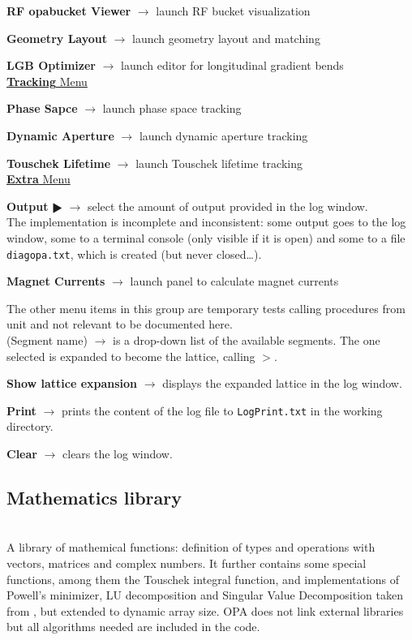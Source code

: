 \documentclass[12pt]{article}
\newcommand\code[1]{{\tt #1}}
\newcommand{\ofld}[1]{\colorbox{black!15}{{{\color{black}\bf #1}}}}
\newcommand{\ofldx}[1]{\colorbox{black!15}{{\color{black}(#1)}}}
\newcommand\guico[1]{{\color{blue}\code{#1}}}
\newcommand{\unico}[1]{{\color{burntorange}\code{#1}}}
\newcommand{\evcod}[2]{\ofld{#1} $\rightarrow$ \guico{#2}}
\newcommand{\evcodx}[2]{\ofldx{#1} $\rightarrow$ \guico{#2}}
\newcommand{\prcod}[2]{\opauni{#1}$>$\unico{#2}}
\newcommand{\opagui}[1]{\colorbox{blue!20}{{\color{black}\code{#1}}}}
\newcommand{\ogui}[1]{\hyperref[#1]{\opagui{#1}}}
\newcommand{\opauni}[1]{\colorbox{orange!30}{{\color{black}\code{#1}}}}
\newcommand{\ounih}[2]{\subsection{\label{#2}#1}{\Huge\opauni{#2}}\\}
\newcommand{\ouni}[1]{\hyperref[#1]{\opauni{#1}}}
\newcommand{\desc}[1]{#1}
\newcommand{\todo}[1]{{\color{red} #1}}
\begin{document}
{\evcod{RF opabucket Viewer}{ds\_rfbu} launch RF bucket visualization \ogui{opabucket}

\evcod{Geometry Layout}{ds\_geo } launch geometry layout and matching \ogui{opageometry}

\evcod{LGB Optimizer}{ds\_lgbo } launch editor for longitudinal gradient bends \ogui{opalgbedit}\\


\underline{\ofld{Tracking} Menu}

\evcod{Phase Sapce}{tr\_phsp} launch phase space tracking \ogui{opatrackps}

\evcod{Dynamic Aperture}{tr\_dyna} launch dynamic aperture tracking \ogui{opatrackda}

\evcod{Touschek Lifetime}{tr\_ttau} launch Touschek lifetime tracking \ogui{opatracktt}\\

\underline{\ofld{Extra} Menu}

\evcod{Output $\RHD$}{tm\_di} select the amount of output provided in the log window.\\ \todo{The implementation is incomplete and inconsistent: some output goes to the log window, some to a terminal console (only visible if it is open) and some to a file \code{diagopa.txt}, which is created (but never closed\dots).}

\evcod{Magnet Currents}{tm\_cur} launch panel to calculate magnet currents \ogui{opacurrents}

The other menu items in this group are temporary tests calling procedures from unit \ouni{testcode} and not relevant to be documented here.\\

\evcodx{Segment name}{ComboSeg} is a drop-down list of the available segments. The one selected is expanded to become the lattice, calling \prcod{globlib}{MakeLattice}.

\evcod{Show lattice expansion}{butlatsh} displays the expanded lattice in the log window.

\evcod{Print}{ButLogPrt} prints the content of the log file to \code{LogPrint.txt} in the working directory.

\evcod{Clear}{ButLogClr} clears the log window.
}


\ounih{Mathematics library}{mathlib}

\desc{
A library of mathemical functions: definition of types and operations with vectors, matrices and complex numbers. It further contains some special functions, among them the Touschek integral function, and implementations of Powell's minimizer, LU decomposition and Singular Value Decomposition taken from \cite{numrec}, but extended to dynamic array size. OPA does not link external libraries but all algorithms needed are included in the code.}
\end{document}
